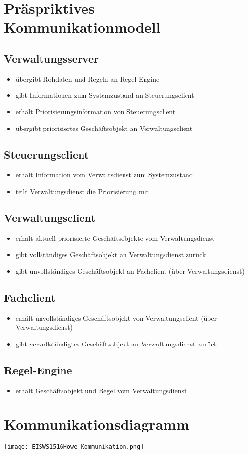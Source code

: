 \documentclass[11pt,oneside,a4paper,notitlepage]{article}
\begin{document}
\section{Präspriktives Kommunikationmodell}

\subsection*{Verwaltungsserver}
\begin{itemize}
\item übergibt Rohdaten und Regeln an Regel-Engine
\item gibt Informationen zum Systemzustand an Steuerungsclient
\item erhält Priorisierungsinformation von Steuerungsclient
\item übergibt priorisiertes Geschäftsobjekt an Verwaltungsclient
\end{itemize}

\subsection*{Steuerungsclient}
\begin{itemize}
\item erhält Information vom Verwaltsdienst zum Systemzustand %
\item teilt Verwaltungsdienst die Priorisierung mit%
\end{itemize}

\subsection*{Verwaltungsclient}
\begin{itemize}
\item erhält aktuell priorisierte Geschäftsobjekte vom Verwaltungsdienst
\item gibt vollständiges Geschäftsobjekt an Verwaltungsdienst zurück
\item gibt unvollständiges Geschäftsobjekt an Fachclient (über Verwaltungsdienst)
\end{itemize}

\subsection*{Fachclient}
\begin{itemize}
\item erhält unvollständiges Geschäftsobjekt von Verwaltungsclient (über Verwaltungsdienst)
\item gibt vervollständigtes Geschäftsobjekt an Verwaltungsdienst zurück
\end{itemize}

\subsection*{Regel-Engine}
\begin{itemize}
\item erhält Geschäftsobjekt und Regel vom Verwaltungsdienst
\end{itemize}


\section{Kommunikationsdiagramm}

\texttt{[image: EISWS1516Howe\_Kommunikation.png]}
\noindent
\end{document}
